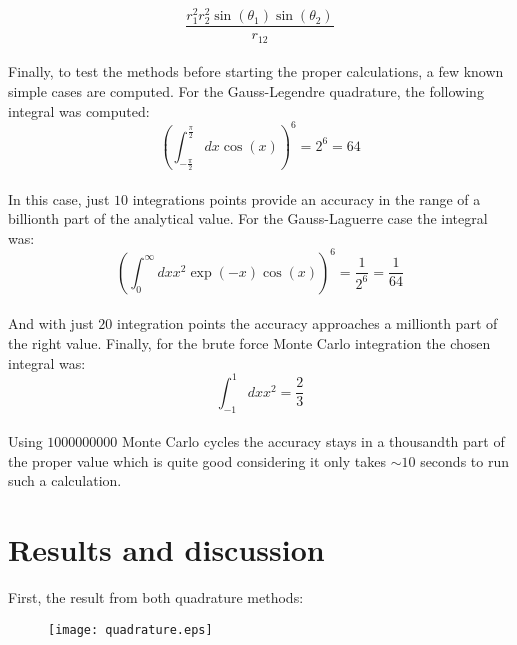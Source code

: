 \documentclass[11pt,a4paper,oneside]{article}
\begin{document}
		\begin{equation*}\frac{r_1^2r_2^2\sin{\left(\theta_1\right)}\sin{\left(\theta_2\right)}}{r_{12}}\end{equation*}\\
		
		Finally, to test the methods before starting the proper calculations, a few known simple cases are computed. For the Gauss-Legendre quadrature, the following integral was computed:\\
		
		\begin{equation*}\left(\int_{-\frac{\pi}{2}}^{\frac{\pi}{2}}{dx\cos{\left(x\right)}}\right)^6=2^6=64\end{equation*}\\
		
		In this case, just $10$ integrations points provide an accuracy in the range of a billionth part of the analytical value. For the Gauss-Laguerre case the integral was:\\
		
		\begin{equation*}\left(\int_0^\infty{dxx^2\exp{\left(-x\right)}\cos{\left(x\right)}}\right)^6=\frac{1}{2^6}=\frac{1}{64}\end{equation*}\\
		
		And with just $20$ integration points the accuracy approaches a millionth part of the right value. Finally, for the brute force Monte Carlo integration the chosen integral was:\\

		\begin{equation*}\int_{-1}^1{dxx^2}=\frac{2}{3}\end{equation*}\\
		
		Using $1000000000$ Monte Carlo cycles the accuracy stays in a thousandth part of the proper value which is quite good considering it only takes $\sim10$ seconds to run such a calculation.\\
		
	\section{Results and discussion}

		First, the result from both quadrature methods:\newpage
		
		\begin{figure}[ht!]\begin{center}\texttt{[image: quadrature.eps]}\par\end{center}\protect\end{figure}
		
\end{document}
